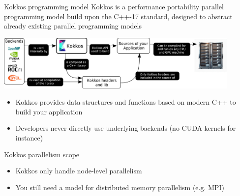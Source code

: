 \documentclass[aspectratio=169]{beamer}
\begin{document}
\begin{frame}{Kokkos programming model}
    Kokkos is a performance portability parallel programming model build upon the C++-17 standard, designed to abstract already existing parallel programming models

    \vspace{0.5em}

    \begin{center}
        \includegraphics[width=0.9\textwidth]{kokkos_model.png}
    \end{center}
    \begin{itemize}
        \item Kokkos provides data structures and functions based on modern C++ to build your application
        \item Developers never directly use underlying backends (no CUDA kernels for instance)
    \end{itemize}
\end{frame}


\begin{frame}{Kokkos parallelism scope}
    \begin{itemize}
        \item Kokkos only handle node-level parallelism
        \item You still need a model for distributed memory parallelism (e.g. MPI)
    \end{itemize}
\end{frame}

\end{document}
